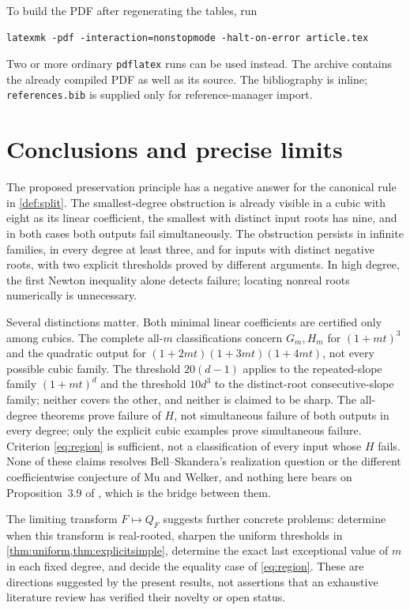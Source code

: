 \documentclass[11pt,letterpaper]{article}
\numberwithin{equation}{section}
\theoremstyle{definition}
\theoremstyle{remark}
\begin{document}
To build the PDF after regenerating the tables, run
\begin{lstlisting}[language={}]
latexmk -pdf -interaction=nonstopmode -halt-on-error article.tex
\end{lstlisting}
Two or more ordinary \texttt{pdflatex} runs can be used instead. The archive
contains the already compiled PDF as well as its source. The bibliography is
inline; \texttt{references.bib} is supplied only for reference-manager import.

\section{Conclusions and precise limits}\label{sec:conclusion}

The proposed preservation principle has a negative answer for the
canonical rule in \cref{def:split}. The smallest-degree obstruction is
already visible in a cubic with eight as its linear coefficient, the smallest
with distinct input roots has nine, and in both cases both outputs fail
simultaneously. The obstruction persists in infinite
families, in every degree at least three, and for inputs with distinct
negative roots, with two explicit thresholds proved by different arguments.
In high degree, the first Newton inequality alone detects
failure; locating nonreal roots numerically is unnecessary.

Several distinctions matter. Both minimal linear coefficients are certified
only among cubics. The complete all-$m$ classifications concern $G_m,H_m$
for $(1+mt)^3$ and the quadratic output for
$(1+2mt)(1+3mt)(1+4mt)$, not every possible cubic family. The threshold
$20(d-1)$ applies to the repeated-slope family $(1+mt)^d$ and the threshold
$10d^3$ to the distinct-root consecutive-slope family; neither covers the
other, and neither is claimed to be sharp. The all-degree theorems prove
failure of $H$, not simultaneous failure of both outputs in every degree; only
the explicit cubic examples prove simultaneous failure. Criterion
\eqref{eq:region} is sufficient, not a classification of every input whose
$H$ fails. None of these claims resolves Bell--Skandera's realization question
or the different coefficientwise conjecture of Mu and Welker, and nothing here
bears on Proposition~3.9 of \cite{MW}, which is the bridge between them.

The limiting transform $F\mapsto Q_F$ suggests further concrete problems:
determine when this transform is real-rooted, sharpen the uniform thresholds
in \cref{thm:uniform,thm:explicitsimple}, determine the exact last exceptional
value of $m$ in each fixed degree, and decide the equality case of
\eqref{eq:region}. These are directions suggested by the present
results, not assertions that an exhaustive literature review has verified
their novelty or open status.
\end{document}
